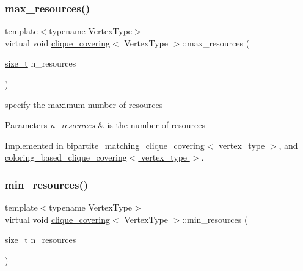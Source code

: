 \mbox{\label{classclique__covering_a4bdfaa7dece2c8c97f09a2a1a4827cb4}} 
\subsubsection{\texorpdfstring{max\+\_\+resources()}{max\_resources()}}
{\footnotesize\ttfamily template$<$typename Vertex\+Type$>$ \\
virtual void \hyperlink{classclique__covering}{clique\+\_\+covering}$<$ Vertex\+Type $>$\+::max\+\_\+resources (\begin{DoxyParamCaption}\item[{\hyperlink{tutorial__fpt__2017_2intro_2sixth_2test_8c_a7c94ea6f8948649f8d181ae55911eeaf}{size\+\_\+t}}]{n\+\_\+resources }\end{DoxyParamCaption})\hspace{0.3cm}{\ttfamily [pure virtual]}}



specify the maximum number of resources 


\begin{DoxyParams}{Parameters}
{\em n\+\_\+resources} & is the number of resources \\
\hline
\end{DoxyParams}


Implemented in \hyperlink{classbipartite__matching__clique__covering_a94f457764eb9a86767f63a040b9dc2da}{bipartite\+\_\+matching\+\_\+clique\+\_\+covering$<$ vertex\+\_\+type $>$}, and \hyperlink{classcoloring__based__clique__covering_ab2975cc7163940660b65d3c0b967cf9b}{coloring\+\_\+based\+\_\+clique\+\_\+covering$<$ vertex\+\_\+type $>$}.

\mbox{\label{classclique__covering_a031948f90f5b05911a91b85c578fc9ca}} 
\subsubsection{\texorpdfstring{min\+\_\+resources()}{min\_resources()}}
{\footnotesize\ttfamily template$<$typename Vertex\+Type$>$ \\
virtual void \hyperlink{classclique__covering}{clique\+\_\+covering}$<$ Vertex\+Type $>$\+::min\+\_\+resources (\begin{DoxyParamCaption}\item[{\hyperlink{tutorial__fpt__2017_2intro_2sixth_2test_8c_a7c94ea6f8948649f8d181ae55911eeaf}{size\+\_\+t}}]{n\+\_\+resources }\end{DoxyParamCaption})\hspace{0.3cm}{\ttfamily [pure virtual]}}



